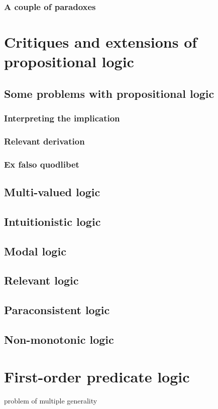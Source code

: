 \subsection{A couple of paradoxes}

\chapter{Critiques and extensions of propositional logic}
\section{Some problems with propositional logic}
\subsection{Interpreting the implication}
\subsection{Relevant derivation}
\subsection{Ex falso quodlibet}
\section{Multi-valued logic}
\section{Intuitionistic logic}
\section{Modal logic}
\section{Relevant logic}
\section{Paraconsistent logic}
\section{Non-monotonic logic}

\chapter{First-order predicate logic}
problem of multiple generality
